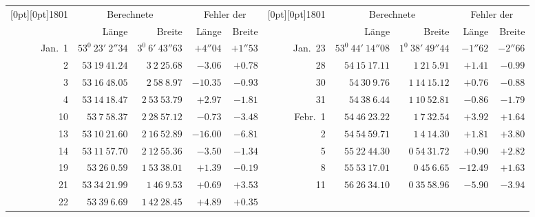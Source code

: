 \begin{center}
{\fontsize{8}{9.6}\selectfont\setlength{\tabcolsep}{1.25pt}
\setlength{\arrayrulewidth}{.3pt}\setlength{\doublerulesep}{1pt}
\begin{tabular}{r|r|r|r|r||r|r|r|r|r}
\raisebox{-.5\baselineskip}[0pt][0pt]{1801}&\multicolumn{2}{c|}{Berechnete}&\multicolumn{2}{c||}{Fehler der}&\raisebox{-.5\baselineskip}[0pt][0pt]{1801}&\multicolumn{2}{c|}{Berechnete}&\multicolumn{2}{c}{Fehler der}\\
&Länge&Breite&Länge&Breite&&Länge&Breite&Länge&Breite\\\hline
Jan.\ 1&$53^0\ 23'\ 2''34$&$3^0\ 6'\ 43''63$&$+4''04$&$+1''53$&Jan.\ 23&$53^0\ 44'\ 14''08$&$1^0\ 38'\ 49''44$&$-1''62$&$-2''66$\\
2&$53\ 19\ 41.24$&$3\ 2\ 25.68$&$-3.06$&$+0.78$&28&$54\ 15\ 17.11$&$1\ 21\ 5.91$&$+1.41$&$-0.99$\\
3&$53\ 16\ 48.05$&$2\ 58\ 8.97$&$-10.35$&$-0.93$&30&$54\ 30\ 9.76$&$1\ 14\ 15.12$&$+0.76$&$-0.88$\\
4&$53\ 14\ 18.47$&$2\ 53\ 53.79$&$+2.97$&$-1.81$&31&$54\ 38\ 6.44$&$1\ 10\ 52.81$&$-0.86$&$-1.79$\\
10&$53\ 7\ 58.37$&$2\ 28\ 57.12$&$-0.73$&$-3.48$&Febr.\ 1&$54\ 46\ 23.22$&$1\ 7\ 32.54$&$+3.92$&$+1.64$\\
13&$53\ 10\ 21.60$&$2\ 16\ 52.89$&$-16.00$&$-6.81$&2&$54\ 54\ 59.71$&$1\ 4\ 14.30$&$+1.81$&$+3.80$\\
14&$53\ 11\ 57.70$&$2\ 12\ 55.36$&$-3.50$&$-1.34$&5&$55\ 22\ 44.30$&$0\ 54\ 31.72$&$+0.90$&$+2.82$\\
19&$53\ 26\ 0.59$&$1\ 53\ 38.01$&$+1.39$&$-0.19$&8&$55\ 53\ 17.01$&$0\ 45\ 6.65$&$-12.49$&$+1.63$\\
21&$53\ 34\ 21.99$&$1\ 46\ 9.53$&$+0.69$&$+3.53$&11&$56\ 26\ 34.10$&$0\ 35\ 58.96$&$-5.90$&$-3.94$\\
22&$53\ 39\ 6.69$&$1\ 42\ 28.45$&$+4.89$&$+0.35$&\multicolumn{5}{l}{}
\end{tabular}}
\end{center}
\fontsize{10.5}{11.5}\selectfont
